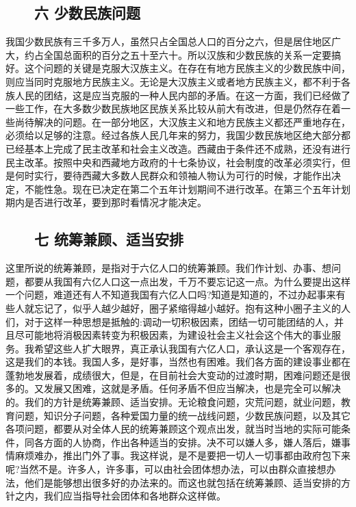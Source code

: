 \documentclass[cn,11pt,chinese]{elegantbook}
\def\myformat#1{\hfil\hfil #1}
\begin{document}
\subsection*{\myformat{　　六 少数民族问题}}
我国少数民族有三千多万人，虽然只占全国总人口的百分之六，但是居住地区广大，约占全国总面积的百分之五十至六十。所以汉族和少数民族的关系一定要搞好。这个问题的关键是克服大汉族主义。在存在有地方民族主义的少数民族中间，则应当同时克服地方民族主义。无论是大汉族主义或者地方民族主义，都不利于各族人民的团结，这是应当克服的一种人民内部的矛盾。在这一方面，我们已经做了一些工作，在大多数少数民族地区民族关系比较从前大有改进，但是仍然存在着一些尚待解决的问题。在一部分地区，大汉族主义和地方民族主义都还严重地存在，必须给以足够的注意。经过各族人民几年来的努力，我国少数民族地区绝大部分都已经基本上完成了民主改革和社会主义改造。西藏由于条件还不成熟，还没有进行民主改革。按照中央和西藏地方政府的十七条协议，社会制度的改革必须实行，但是何时实行，要待西藏大多数人民群众和领袖人物认为可行的时候，才能作出决定，不能性急。现在已决定在第二个五年计划期间不进行改革。在第三个五年计划期内是否进行改革，要到那时看情况才能决定。\\
\subsection*{\myformat{　　七 统筹兼顾、适当安排}}
这里所说的统筹兼顾，是指对于六亿人口的统筹兼顾。我们作计划、办事、想问题，都要从我国有六亿人口这一点出发，千万不要忘记这一点。为什么要提出这样一个问题，难道还有人不知道我国有六亿人口吗?知道是知道的，不过办起事来有些人就忘记了，似乎人越少越好，圈子紧缩得越小越好。抱有这种小圈子主义的人们，对于这样一种思想是抵触的:调动一切积极因素，团结一切可能团结的人，并且尽可能地将消极因素转变为积极因素，为建设社会主义社会这个伟大的事业服务。我希望这些人扩大眼界，真正承认我国有六亿人口，承认这是一个客观存在，这是我们的本钱。我国人多，是好事，当然也有困难。我们各方面的建设事业都在蓬勃地发展着，成绩很大，但是，在目前社会大变动的过渡时期，困难问题还是很多的。又发展又困难，这就是矛盾。任何矛盾不但应当解决，也是完全可以解决的。我们的方针是统筹兼顾、适当安排。无论粮食问题，灾荒问题，就业问题，教育问题，知识分子问题，各种爱国力量的统一战线问题，少数民族问题，以及其它各项问题，都要从对全体人民的统筹兼顾这个观点出发，就当时当地的实际可能条件，同各方面的人协商，作出各种适当的安排。决不可以嫌人多，嫌人落后，嫌事情麻烦难办，推出门外了事。我这样说，是不是要把一切人一切事都由政府包下来呢?当然不是。许多人，许多事，可以由社会团体想办法，可以由群众直接想办法，他们是能够想出很多好的办法来的。而这也就包括在统筹兼顾、适当安排的方针之内，我们应当指导社会团体和各地群众这样做。\\
\end{document}
